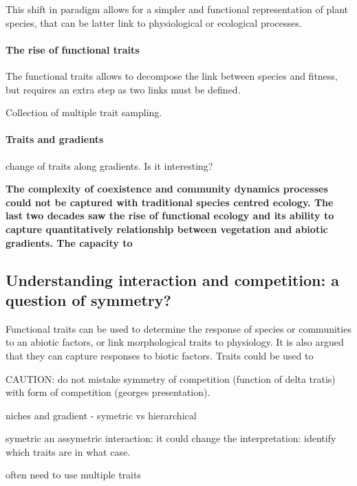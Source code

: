 This shift in paradigm allows for a simpler and functional representation of plant species, that can be latter link to physiological or ecological processes.




\paragraph{The rise of functional traits}

The functional traits allows to decompose the link between species and fitness, but requires an extra step as two links must be defined. 

Collection of multiple trait sampling.

\paragraph{Traits and gradients}


change of traits along gradients. Is it interesting?



\textbf{The complexity of coexistence and community dynamics processes could not be captured with traditional species centred ecology. The last two decades saw the rise of functional ecology and its ability to capture quantitatively relationship between vegetation and abiotic gradients. The capacity to }

\subsection{Understanding interaction and competition: a question of symmetry?}

Functional traits can be used to determine the response of species or communities to an abiotic factors, or link morphological traits to physiology. It is also argued that they can capture responses to biotic factors. Traits could be used to 

CAUTION: do not mistake symmetry of competition (function of delta tratis) with form of competition (georges presentation). 


niches and gradient - symetric vs hierarchical 

symetric an assymetric interaction: it could change the interpretation: identify which traits are in what case.


\parencite{kraft_functional_2008}
often need to use multiple traits \parencite{kraft_plant_2015}


